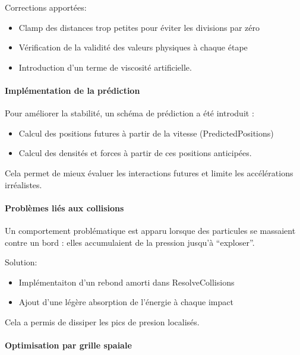 \documentclass{article}
\begin{document}
Corrections apportées:

\begin{itemize}
    \item Clamp des distances trop petites pour éviter les divisions par zéro
    \item Vérification de la validité des valeurs physiques à chaque étape
    \item Introduction d’un terme de viscosité artificielle.
\end{itemize}

\paragraph{Implémentation de la prédiction}

Pour améliorer la stabilité, un schéma de prédiction a été introduit :

\begin{itemize}
    \item Calcul des positions futures à partir de la vitesse (PredictedPositions)
    \item Calcul des densités et forces à partir de ces positions anticipées.
\end{itemize}

Cela permet de mieux évaluer les interactions futures et limite les accélérations irréalistes.

\paragraph{Problèmes liés aux collisions}

Un comportement problématique est apparu lorsque des particules se massaient contre un bord : elles accumulaient de la pression jusqu’à ``exploser''.

Solution:

\begin{itemize}
    \item Implémentaiton d'un rebond amorti dans ResolveCollisions
    \item Ajout d'une légère absorption de l'énergie à chaque impact
\end{itemize}

Cela a permis de dissiper les pics de presion localisés.

\paragraph{Optimisation par grille spaiale}
\end{document}
